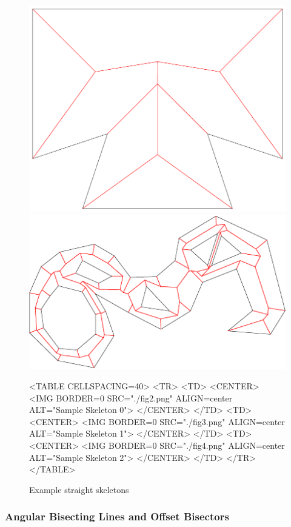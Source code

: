 \begin{figure}[htbp]
\begin{ccTexOnly}
\begin{center}
\includegraphics{fig3} %
\includegraphics{fig4} %
\end{center}
\end{ccTexOnly}
\caption{Example straight skeletons
\label{SampleSLS}}
\begin{ccHtmlOnly}
<TABLE CELLSPACING=40>
<TR>
<TD>
<CENTER>
<IMG BORDER=0 SRC="./fig2.png" ALIGN=center ALT="Sample Skeleton 0">
</CENTER>
</TD>
<TD>
<CENTER>
<IMG BORDER=0 SRC="./fig3.png" ALIGN=center ALT="Sample Skeleton 1">
</CENTER>
</TD>
<TD>
<CENTER>
<IMG BORDER=0 SRC="./fig4.png" ALIGN=center ALT="Sample Skeleton 2">
</CENTER>
</TD>
</TR>
</TABLE>
\end{ccHtmlOnly}
\end{figure}
  
\subsubsection{Angular Bisecting Lines and Offset Bisectors}  

